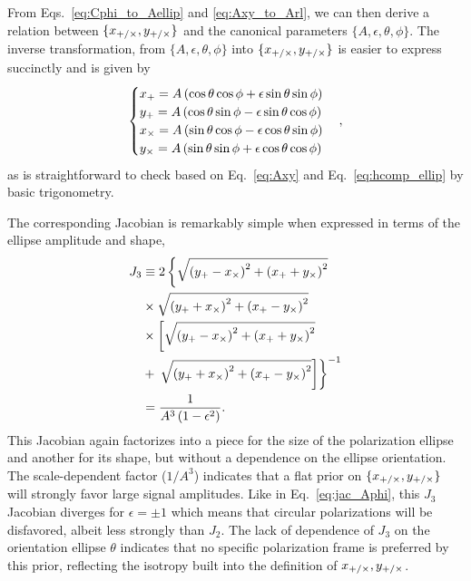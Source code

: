 \documentclass[aps,prd,twocolumn,superscriptaddress,preprintnumbers,floatfix,nofootinbib]{revtex4-2}
\newcommand*{\eq}[1]{Eq.~\eqref{eq:#1}}
\begin{document}
From Eqs.~\eqref{eq:Cphi_to_Aellip} and \eqref{eq:Axy_to_Arl}, we can then derive a relation between $\{x_{+/\times}, y_{+/\times}\}$ and the canonical parameters $\{A,\epsilon,\theta,\phi\}$.
The inverse transformation, from  $\{A,\epsilon,\theta,\phi\}$ into $\{x_{+/\times}, y_{+/\times}\}$ is easier to express succinctly and is given by
\begin{equation} \label{eq:Axy_to_Aeps}
\begin{cases}
x_{+} = A \left(\cos\theta \cos\phi + \epsilon \sin\theta \sin\phi\right)\\
y_{+} = A \left(\cos\theta \sin\phi - \epsilon \sin\theta \cos\phi\right)\\
x_{\times} = A \left(\sin\theta \cos\phi - \epsilon \cos\theta \sin\phi\right)\\
y_{\times} = A \left(\sin\theta \sin\phi + \epsilon \cos\theta \cos\phi\right)
\end{cases} ,
\end{equation}
as is straightforward to check based on \eq{Axy} and \eq{hcomp_ellip} by basic trigonometry.

The corresponding Jacobian is remarkably simple when expressed in terms of the ellipse amplitude and shape,
\begin{subequations} \label{eq:jac_Aeps_Axy}
\begin{align}
J_3 &\equiv 2 \left\{\sqrt{\left(y_{+} -x_{\times} \right)^2 +\left(x_{+} +y_{\times}\right)^2}
\right. \nonumber \\
&\times \sqrt{\left(y_{+} + x_{\times}\right)^2 + \left(x_{+} - y_{\times}\right)^2}  \nonumber\\
&\times \left[ \sqrt{\left(y_{+} -x_{\times} \right)^2 +\left(x_{+} +y_{\times}\right)^2} \right.  \nonumber\\
&+ \left.\left. \sqrt{\left(y_{+} + x_{\times}\right)^2 + \left(x_{+} - y_{\times}\right)^2} \right]\right\}^{-1} \\
&= \frac{1}{A^{3} \left(1 - \epsilon^2\right)}  .
\end{align}
\end{subequations}
This Jacobian again factorizes into a piece for the size of the polarization ellipse and another for its shape, but without a dependence on the ellipse orientation.
The scale-dependent factor ($1/A^3$) indicates that a flat prior on $\{x_{+/\times},y_{+/\times}\}$ will strongly favor large signal amplitudes.
Like in \eq{jac_Aphi}, this $J_3$ Jacobian diverges for $\epsilon = \pm 1$ which means that circular polarizations will be disfavored, albeit less strongly than $J_2$.
The lack of dependence of $J_3$ on the orientation ellipse $\theta$ indicates that no specific polarization frame is preferred by this prior, reflecting the isotropy built into the definition of $x_{+/\times}, y_{+/\times}$.
\end{document}
